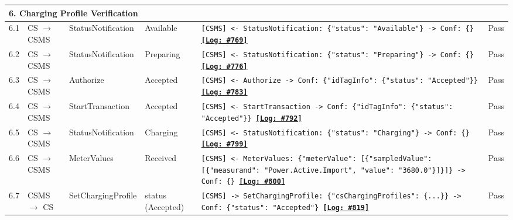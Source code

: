 \documentclass[10pt, a4paper, landscape]{article}
\begin{document}
\begin{longtable}{|p{1.0cm}|p{2.5cm}|p{4.0cm}|p{5.0cm}|p{10.0cm}|c|}
\multicolumn{6}{|l|}{\cellcolor{blue!10}\textbf{6. Charging Profile Verification}} \\
\hline
6.1 & CS $\to$ CSMS & StatusNotification & Available & \footnotesize\texttt{[CSMS] <- StatusNotification: \{"status": "Available"\} \newline [CSMS] -> Conf: \{\} \newline \hyperref[log:6.1]{\textbf{[Log: \#769]}}} & Pass \\
\hline
6.2 & CS $\to$ CSMS & StatusNotification & Preparing & \footnotesize\texttt{[CSMS] <- StatusNotification: \{"status": "Preparing"\} \newline [CSMS] -> Conf: \{\} \newline \hyperref[log:6.2]{\textbf{[Log: \#776]}}} & Pass \\
\hline
6.3 & CS $\to$ CSMS & Authorize & Accepted & \footnotesize\texttt{[CSMS] <- Authorize \newline [CSMS] -> Conf: \{"idTagInfo": \{"status": "Accepted"\}\} \newline \hyperref[log:6.3]{\textbf{[Log: \#783]}}} & Pass \\
\hline
6.4 & CS $\to$ CSMS & StartTransaction & Accepted & \footnotesize\texttt{[CSMS] <- StartTransaction \newline [CSMS] -> Conf: \{"idTagInfo": \{"status": "Accepted"\}\} \newline \hyperref[log:6.4]{\textbf{[Log: \#792]}}} & Pass \\
\hline
6.5 & CS $\to$ CSMS & StatusNotification & Charging & \footnotesize\texttt{[CSMS] <- StatusNotification: \{"status": "Charging"\} \newline [CSMS] -> Conf: \{\} \newline \hyperref[log:6.5]{\textbf{[Log: \#799]}}} & Pass \\
\hline
6.6 & CS $\to$ CSMS & MeterValues & Received & \footnotesize\texttt{[CSMS] <- MeterValues: \{"meterValue": [\{"sampledValue": [\{"measurand": "Power.Active.Import", "value": "3680.0"\}]\}]\} \newline [CSMS] -> Conf: \{\} \newline \hyperref[log:6.6]{\textbf{[Log: \#800]}}} & Pass \\
\hline
6.7 & CSMS $\to$ CS & SetChargingProfile & status (Accepted) & \footnotesize\texttt{[CSMS] -> SetChargingProfile: \{"csChargingProfiles": \{...\}\} \newline [CS] -> Conf: \{"status": "Accepted"\} \newline \hyperref[log:6.7]{\textbf{[Log: \#819]}}} & Pass \\

\end{longtable}
\end{document}

